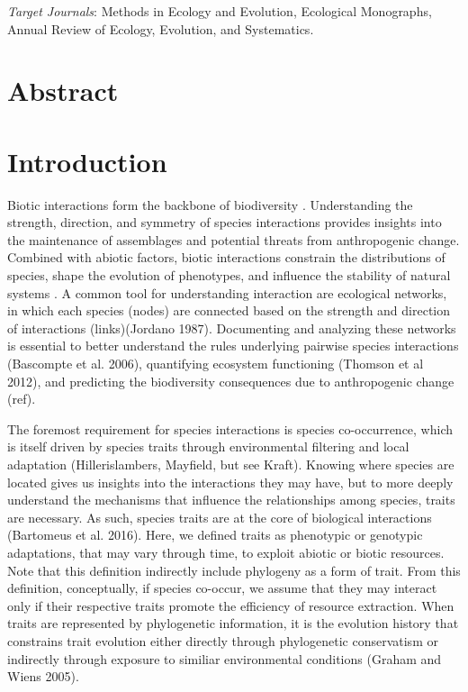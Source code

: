 \emph{Target Journals}: Methods in Ecology and Evolution, Ecological Monographs,
Annual Review of Ecology, Evolution, and Systematics.

\section*{Abstract}
\label{abstract}

\section*{Introduction}
\label{introduction}

Biotic interactions form the backbone of biodiversity
\cite{bascompte_plant-animal_2007}. Understanding the strength, direction, and
symmetry of species interactions provides insights into the maintenance of
assemblages and potential threats from anthropogenic change. Combined with
abiotic factors, biotic interactions constrain the distributions of species,
shape the evolution of phenotypes, and influence the stability of natural
systems \cite{schleuning_predicting_2015}. A common tool for understanding
interaction are ecological networks, in which each species (nodes) are connected
based on the strength and direction of interactions (links)(Jordano 1987).
Documenting and analyzing these networks is essential to better understand the
rules underlying pairwise species interactions (Bascompte et al. 2006),
quantifying ecosystem functioning (Thomson et al 2012), and predicting the
biodiversity consequences due to anthropogenic change (ref).

The foremost requirement for species interactions is species co-occurrence,
which is itself driven by species traits through environmental filtering and
local adaptation (Hillerislambers, Mayfield, but see Kraft). Knowing where
species are located gives us insights into the interactions they may have, but
to more deeply understand the mechanisms that influence the relationships among
species, traits are necessary. As such, species traits are at the core of
biological interactions (Bartomeus et al. 2016). Here, we defined traits as
phenotypic or genotypic adaptations, that may vary through time, to exploit
abiotic or biotic resources. Note that this definition indirectly include
phylogeny as a form of trait. From this definition, conceptually, if species
co-occur, we assume that they may interact only if their respective traits
promote the efficiency of resource extraction. When traits are represented by
phylogenetic information, it is the evolution history that constrains trait
evolution either directly through phylogenetic conservatism or indirectly
through exposure to similiar environmental conditions (Graham and Wiens 2005).

